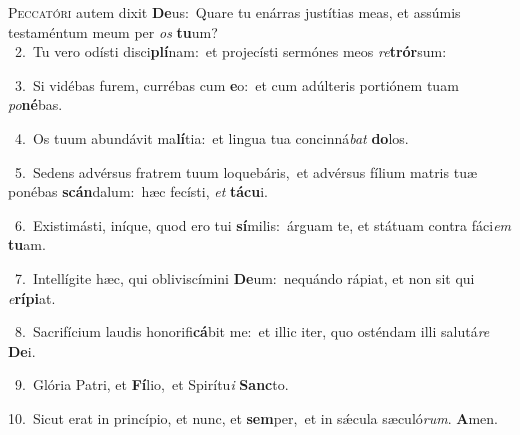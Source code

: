 \lettrine{\initial\textcolor{\initialcolor}{P}}{eccatóri} autem dixit \textbf{De}\-us:~\star Quare tu enárras justítias meas, et assúmis testaméntum meum per \textit{os} \textbf{tu}\-um?\\
{\numbfont\textcolor{\numbcolor}{~2.}}~Tu vero odísti disci\-\textbf{plí}\-nam:~\star et projecísti sermónes meos \textit{re}\-\textbf{trór}sum:\par
{\numbfont\textcolor{\numbcolor}{~3.}}~Si vidébas furem, currébas cum \textbf{e}\-o:~\star et cum adúlteris portiónem tuam \textit{po}\-\textbf{né}bas.\par
{\numbfont\textcolor{\numbcolor}{~4.}}~Os tuum abundávit ma\-\textbf{lí}\-tia:~\star et lingua tua concinná\textit{bat} \textbf{do}\-los.\par
{\numbfont\textcolor{\numbcolor}{~5.}}~Sedens advérsus fratrem tuum loquebáris,~\dagger et advérsus fílium matris tuæ ponébas \textbf{scán}\-dalum:~\star hæc fecísti, \textit{et} \textbf{tá}\-\textbf{cu}i.\par
{\numbfont\textcolor{\numbcolor}{~6.}}~Existimásti, iníque, quod ero tui \textbf{sí}\-milis:~\star árguam te, et státuam contra fáci\textit{em} \textbf{tu}\-am.\par
{\numbfont\textcolor{\numbcolor}{~7.}}~Intellígite hæc, qui obliviscímini \textbf{De}\-um:~\star nequándo rápiat, et non sit qui \textit{e}\-\textbf{rí}\textbf{pi}at.\par
{\numbfont\textcolor{\numbcolor}{~8.}}~Sacrifícium laudis honorifi\-\textbf{cá}\-bit me:~\star et illic iter, quo osténdam illi salutá\textit{re} \textbf{De}\-i.\par
{\numbfont\textcolor{\numbcolor}{~9.}}~Glória Patri, et \textbf{Fí}\-lio,~\star et Spirítu\textit{i} \textbf{Sanc}\-to.\par
{\numbfont\textcolor{\numbcolor}{10.}}~Sicut erat in princípio, et nunc, et \textbf{sem}\-per,~\star et in sǽcula sæculó\-\textit{rum}\-. \textbf{A}\-men.\par
